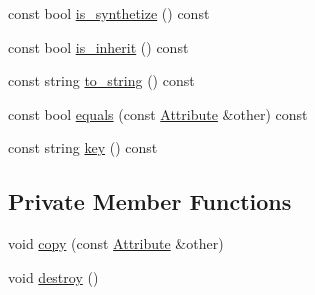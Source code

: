 \begin{DoxyCompactItemize}
const bool \hyperlink{classgenevalmag_1_1Attribute_aadba4924920a427077f71234c9beb3b5}{is\_\-synthetize} () const 
\item 
const bool \hyperlink{classgenevalmag_1_1Attribute_a1943bd98897321547a21177d4efcf302}{is\_\-inherit} () const 
\item 
const string \hyperlink{classgenevalmag_1_1Attribute_a27c1b94db4a836b9fcda1d26146d1db6}{to\_\-string} () const 
\item 
const bool \hyperlink{classgenevalmag_1_1Attribute_a1fa5839094c3ea82c49d1ee6319344ae}{equals} (const \hyperlink{classgenevalmag_1_1Attribute}{Attribute} \&other) const 
\item 
const string \hyperlink{classgenevalmag_1_1Attribute_a6692cef1261bf52199e8fbc81c15f010}{key} () const 
\end{DoxyCompactItemize}
\subsection*{Private Member Functions}
\begin{DoxyCompactItemize}
\item 
void \hyperlink{classgenevalmag_1_1Attribute_a55686b1777729123c1cd8ad1e813ea53}{copy} (const \hyperlink{classgenevalmag_1_1Attribute}{Attribute} \&other)
\item 
void \hyperlink{classgenevalmag_1_1Attribute_abdc7b01e147fd9b112f8d786a9e5f027}{destroy} ()
\end{DoxyCompactItemize}
